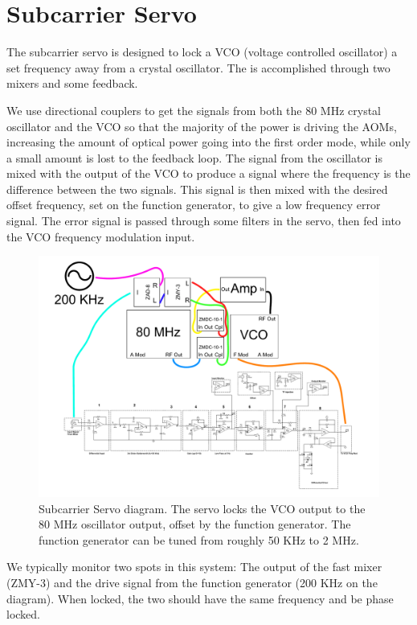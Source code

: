 \section{Subcarrier Servo}
The subcarrier servo is designed to lock a VCO (voltage controlled oscillator) a set frequency away from a crystal oscillator. The is accomplished through two mixers and some feedback. 

We use directional couplers to get the signals from both the 80 MHz crystal oscillator and the VCO so that the majority of the power is driving the AOMs, increasing the amount of optical power going into the first order mode, while only a small amount is lost to the feedback loop. 
The signal from the oscillator is mixed with the output of the VCO to produce a signal where the frequency is the difference between the two signals. 
This signal is then mixed with the desired offset frequency, set on the function generator, to give a low frequency error signal.
The error signal is passed through some filters in the servo, then fed into the VCO frequency modulation input.

\begin{figure}%
\includegraphics[width=1.3\textwidth,angle=90]{figures/controls/SubcarrierServo}%
\caption[Subcarrier Servo]{Subcarrier Servo diagram. The servo locks the VCO output to the 80 MHz oscillator output, offset by the function generator. The function generator can be tuned from roughly 50 KHz to 2 MHz.}%
\label{fig:subcarrierservo}%
\end{figure}

We typically monitor two spots in this system: The output of the fast mixer (ZMY-3) and the drive signal from the function generator (200 KHz on the diagram). When locked, the two should have the same frequency and be phase locked.


